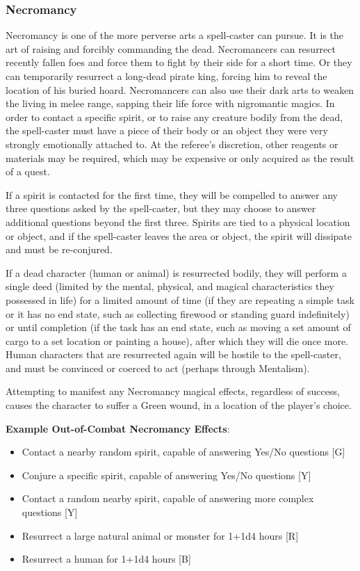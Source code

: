 \documentclass[oneside]{book}
\begin{document}
\begin{multicols}{2}
\subsubsection{Necromancy}
Necromancy is one of the more perverse arts a spell-caster can pursue. It is the art of raising and forcibly commanding the dead. Necromancers can resurrect recently fallen foes and force them to fight by their side for a short time. Or they can temporarily resurrect a long-dead pirate king, forcing him to reveal the location of his buried hoard. Necromancers can also use their dark arts to weaken the living in melee range, sapping their life force with nigromantic magics. In order to contact a specific spirit, or to raise any creature bodily from the dead, the spell-caster must have a piece of their body or an object they were very strongly emotionally attached to. At the referee's discretion, other reagents or materials may be required, which may be expensive or only acquired as the result of a quest.

If a spirit is contacted for the first time, they will be compelled to answer any three questions asked by the spell-caster, but they may choose to answer additional questions beyond the first three. Spirits are tied to a physical location or object, and if the spell-caster leaves the area or object, the spirit will dissipate and must be re-conjured.
 
If a dead character (human or animal) is resurrected bodily, they will perform a single deed (limited by the mental, physical, and magical characteristics they possessed in life) for a limited amount of time (if they are repeating a simple task or it has no end state, such as collecting firewood or standing guard indefinitely) or until completion (if the task has an end state, such as moving a set amount of cargo to a set location or painting a house), after which they will die once more. Human characters that are resurrected again will be hostile to the spell-caster, and must be convinced or coerced to act (perhaps through Mentalism). 

Attempting to manifest any Necromancy magical effects, regardless of success, causes the character to suffer a Green wound, in a location of the player's choice.

\textbf{Example Out-of-Combat Necromancy Effects}:
	\begin{itemize}
		\setlength{\itemsep}{0cm}%
  		\setlength{\parskip}{0cm}%
		\item{ \small Contact a nearby random spirit, capable of answering Yes/No questions  [G]}
		\item{ \small Conjure a specific spirit, capable of answering Yes/No questions [Y]}
		\item{ \small Contact a random nearby spirit, capable of answering more complex questions [Y]}
		\item{ \small Resurrect a large natural animal or monster for 1+1d4 hours [R]}
		\item{ \small Resurrect a human for 1+1d4 hours [B]}
	\end{itemize}
	

\end{multicols}
\end{document}
